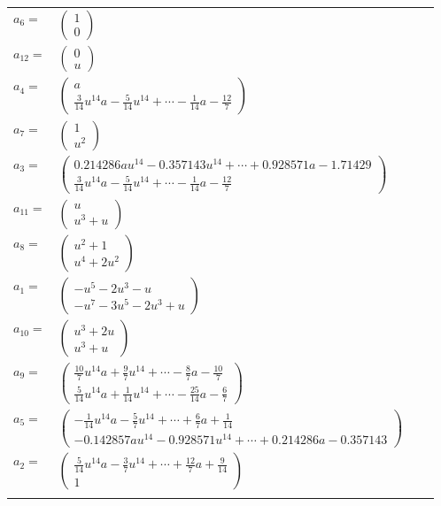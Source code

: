 \documentclass[1p]{elsarticle_modified}
\theoremstyle{definition}
\begin{document}
\begin{tabular}{m{7pt} m{180pt} m{7pt} m{180pt} }
\flushright $a_{6}=$&$\begin{pmatrix}1\\0\end{pmatrix}$ \\
\flushright $a_{12}=$&$\begin{pmatrix}0\\u\end{pmatrix}$ \\
\flushright $a_{4}=$&$\begin{pmatrix}a\\\frac{3}{14} u^{14} a-\frac{5}{14} u^{14}+\cdots-\frac{1}{14} a-\frac{12}{7}\end{pmatrix}$ \\
\flushright $a_{7}=$&$\begin{pmatrix}1\\u^2\end{pmatrix}$ \\
\flushright $a_{3}=$&$\begin{pmatrix}0.214286 a u^{14}-0.357143 u^{14}+\cdots+0.928571 a-1.71429\\\frac{3}{14} u^{14} a-\frac{5}{14} u^{14}+\cdots-\frac{1}{14} a-\frac{12}{7}\end{pmatrix}$ \\
\flushright $a_{11}=$&$\begin{pmatrix}u\\u^3+u\end{pmatrix}$ \\
\flushright $a_{8}=$&$\begin{pmatrix}u^2+1\\u^4+2 u^2\end{pmatrix}$ \\
\flushright $a_{1}=$&$\begin{pmatrix}- u^5-2 u^3- u\\- u^7-3 u^5-2 u^3+u\end{pmatrix}$ \\
\flushright $a_{10}=$&$\begin{pmatrix}u^3+2 u\\u^3+u\end{pmatrix}$ \\
\flushright $a_{9}=$&$\begin{pmatrix}\frac{10}{7} u^{14} a+\frac{9}{7} u^{14}+\cdots-\frac{8}{7} a-\frac{10}{7}\\\frac{5}{14} u^{14} a+\frac{1}{14} u^{14}+\cdots-\frac{25}{14} a-\frac{6}{7}\end{pmatrix}$ \\
\flushright $a_{5}=$&$\begin{pmatrix}-\frac{1}{14} u^{14} a-\frac{5}{7} u^{14}+\cdots+\frac{6}{7} a+\frac{1}{14}\\-0.142857 a u^{14}-0.928571 u^{14}+\cdots+0.214286 a-0.357143\end{pmatrix}$ \\
\flushright $a_{2}=$&$\begin{pmatrix}\frac{5}{14} u^{14} a-\frac{3}{7} u^{14}+\cdots+\frac{12}{7} a+\frac{9}{14}\\1\end{pmatrix}$\\&\end{tabular}
\end{document}
